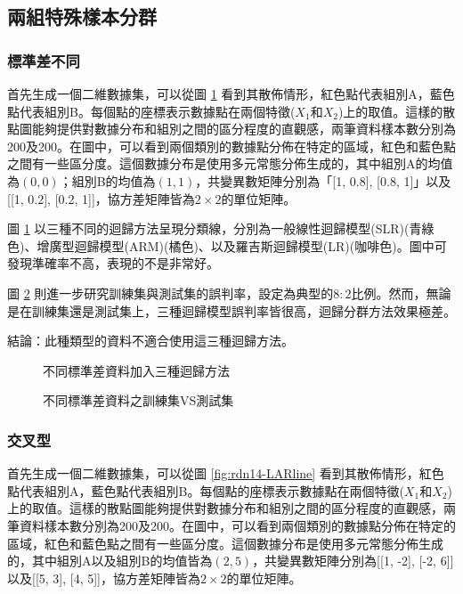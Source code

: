 \subsection{兩組特殊樣本分群}
\subsubsection{標準差不同}
首先生成一個二維數據集，可以從圖 \ref{fig:rdn13-LARline} 看到其散佈情形，紅色點代表組別A，藍色點代表組別B。每個點的座標表示數據點在兩個特徵($X_1$和$X_2$)上的取值。這樣的散點圖能夠提供對數據分布和組別之間的區分程度的直觀感，兩筆資料樣本數分別為200及200。在圖中，可以看到兩個類別的數據點分佈在特定的區域，紅色和藍色點之間有一些區分度。這個數據分布是使用多元常態分佈生成的，其中組別A的均值為$(0, 0)$；組別B的均值為$(1, 1)$，共變異數矩陣分別為「[1, 0.8], [0.8, 1]」以及[[1, 0.2], [0.2, 1]]，協方差矩陣皆為$2 \times 2$的單位矩陣。

圖 \ref{fig:rdn13-LARline} 以三種不同的迴歸方法呈現分類線，分別為一般線性迴歸模型(SLR)(青綠色)、增廣型迴歸模型(ARM)(橘色)、以及羅吉斯迴歸模型(LR)(咖啡色)。圖中可發現準確率不高，表現的不是非常好。

圖 \ref{fig:rdn13-LARline2} 則進一步研究訓練集與測試集的誤判率，設定為典型的$8:2$比例。然而，無論是在訓練集還是測試集上，三種迴歸模型誤判率皆很高，迴歸分群方法效果極差。

結論：此種類型的資料不適合使用這三種迴歸方法。
\begin{figure}[H]
    \caption{不同標準差資料加入三種迴歸方法}
    \label{fig:rdn13-LARline}
\end{figure}
\begin{figure}[H]
    \caption{不同標準差資料之訓練集VS測試集}
    \label{fig:rdn13-LARline2}
\end{figure}
\subsubsection{交叉型}
首先生成一個二維數據集，可以從圖 \ref{fig:rdn14-LARline} 看到其散佈情形，紅色點代表組別A，藍色點代表組別B。每個點的座標表示數據點在兩個特徵($X_1$和$X_2$)上的取值。這樣的散點圖能夠提供對數據分布和組別之間的區分程度的直觀感，兩筆資料樣本數分別為200及200。在圖中，可以看到兩個類別的數據點分佈在特定的區域，紅色和藍色點之間有一些區分度。這個數據分布是使用多元常態分佈生成的，其中組別A以及組別B的均值皆為$(2, 5)$，共變異數矩陣分別為[[1, -2], [-2, 6]]以及[[5, 3], [4, 5]]，協方差矩陣皆為$2 \times 2$的單位矩陣。

